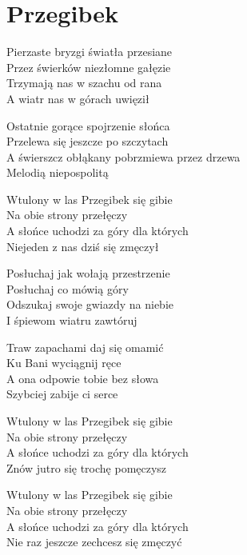 \section{Przegibek}
\begin{text}
Pierzaste bryzgi światła przesiane\\
Przez świerków niezłomne gałęzie\\
Trzymają nas w szachu od rana\\
A wiatr nas w górach uwięził

Ostatnie gorące spojrzenie słońca\\
Przelewa się jeszcze po szczytach\\
A świerszcz obłąkany pobrzmiewa przez drzewa\\
Melodią niepospolitą

Wtulony w las Przegibek się gibie\\
Na obie strony przełęczy\\
A słońce uchodzi za góry dla których\\
Niejeden z nas dziś się zmęczył

Posłuchaj jak wołają przestrzenie\\
Posłuchaj co mówią góry\\
Odszukaj swoje gwiazdy na niebie\\
I śpiewom wiatru zawtóruj

Traw zapachami daj się omamić\\
Ku Bani wyciągnij ręce\\
A ona odpowie tobie bez słowa\\
Szybciej zabije ci serce

Wtulony w las Przegibek się gibie\\
Na obie strony przełęczy\\
A słońce uchodzi za góry dla których\\
Znów jutro się trochę pomęczysz

Wtulony w las Przegibek się gibie\\
Na obie strony przełęczy\\
A słońce uchodzi za góry dla których\\
Nie raz jeszcze zechcesz się zmęczyć
\end{text}